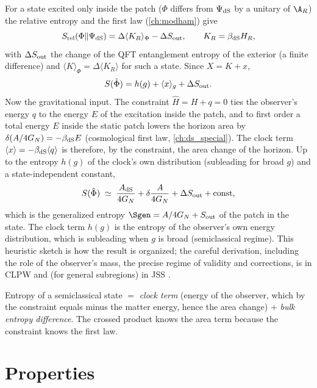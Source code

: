 For a state excited only inside the patch ($\Phi$ differs from $\Psi_{\rm dS}$ by a unitary of $\A_R$) the relative entropy and the first law (\cref{ch:modham}) give
\begin{equation}
S_{\rm rel}(\Phi\|\Psi_{\rm dS})=\Delta\langle K_R\rangle_\Phi-\Delta S_{\rm out},\qquad K_R=\beta_{\rm dS}H_R,
\end{equation}
with $\Delta S_{\rm out}$ the change of the QFT entanglement entropy of the exterior (a finite difference) and $\langle K\rangle_\Phi=\Delta\langle K_R\rangle$ for such a state. Since $X=K+x$,
\begin{equation}
S(\hat\Phi)=h(g)+\langle x\rangle_g+\Delta S_{\rm out}.
\end{equation}
Now the gravitational input. The constraint $\hat H=H+q=0$ ties the observer's energy $q$ to the energy $E$ of the excitation inside the patch, and to first order a total energy $E$ inside the static patch lowers the horizon area by $\delta(A/4G_N)=-\beta_{\rm dS}E$ (cosmological first law, \cref{ch:ds_special}). The clock term $\langle x\rangle=-\beta_{\rm dS}\langle q\rangle$ is therefore, by the constraint, the area change of the horizon. Up to the entropy $h(g)$ of the clock's own distribution (subleading for broad $g$) and a state-independent constant,
\begin{equation}
S(\hat\Phi)\;\simeq\;\frac{A_{\rm dS}}{4G_N}+\delta\frac{A}{4G_N}+\Delta S_{\rm out}+\text{const},
\end{equation}
which is the generalized entropy $\Sgen=A/4G_N+S_{\rm out}$ of the patch in the state. The clock term $h(g)$ is the entropy of the observer's own energy distribution, which is subleading when $g$ is broad (semiclassical regime). This heuristic sketch is how the result is organized; the careful derivation, including the role of the observer's mass, the precise regime of validity and corrections, is in CLPW \cite{CLPW2023} and (for general subregions) in JSS \cite{JSS2023}.

\begin{keyidea}
Entropy of a semiclassical state $=$ \emph{clock term} (energy of the observer, which by the constraint equals minus the matter energy, hence the area change) $+$ \emph{bulk entropy difference}. The crossed product knows the area term because the constraint knows the first law.
\end{keyidea}

\section{Properties}

